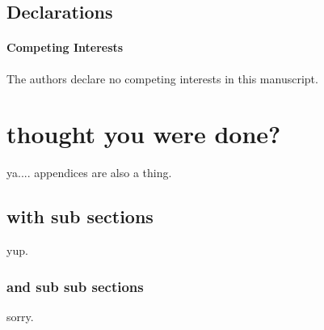 \documentclass[12pt]{article}
\begin{document}
\subsection*{Declarations}
\paragraph{Competing Interests} The authors declare no competing interests in this manuscript.


\begin{spacing}{0.5}
{\footnotesize	}
\end{spacing}

\appendix
\renewcommand\thesection{Appendix~\Alph{section}}
\section{thought you were done?}
\renewcommand\thesection{\Alph{section}}

ya.... appendices are also a thing.

\subsection{with sub sections}
yup.


\subsubsection{and sub sub sections}
sorry.

\theendnotes
\end{document}
